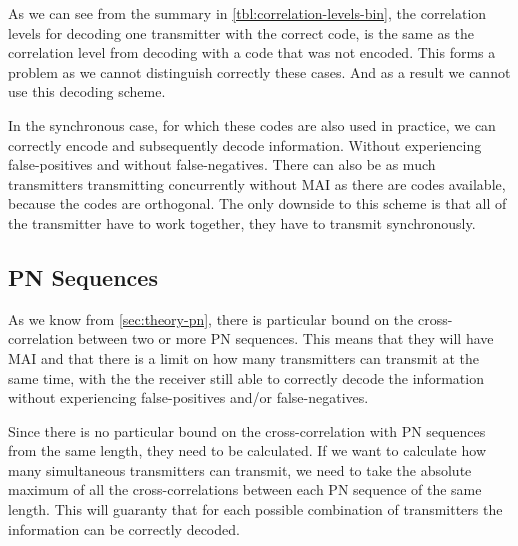 		As we can see from the summary in \autoref{tbl:correlation-levels-bin}, the correlation levels for decoding one transmitter with the correct code, is the same as the correlation level from decoding with a code that was not encoded.
		This forms a problem as we cannot distinguish correctly these cases.
		And as a result we cannot use this decoding scheme. 


		In the synchronous case, for which these codes are also used in practice, we can correctly encode and subsequently decode information. 
		Without experiencing false-positives and without false-negatives.
		There can also be as much transmitters transmitting concurrently without MAI as there are codes available, because the codes are orthogonal.
		The only downside to this scheme is that all of the transmitter have to work together, they have to transmit synchronously.





	\subsection{PN Sequences}

		As we know from \autoref{sec:theory-pn}, there is particular bound on the cross-correlation between two or more PN sequences.
		This means that they will have MAI and that there is a limit on how many transmitters can transmit at the same time, with the the receiver still able to correctly decode the information without experiencing false-positives and/or false-negatives.

		Since there is no particular bound on the cross-correlation with PN sequences from the same length,  they need to be calculated.
		If we want to calculate how many simultaneous transmitters can transmit, we need to take the absolute maximum of all the cross-correlations between each PN sequence of the same length.
		This will guaranty that for each possible combination of transmitters the information can be correctly decoded.

